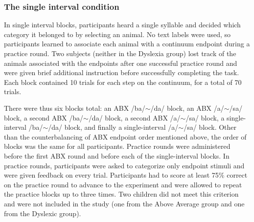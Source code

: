 \documentclass[../uwthesis.tex]{subfiles}
\begin{document}
\subsubsection{The single interval condition}
In single interval blocks, participants heard a single syllable and decided which category it belonged to by selecting an animal. No text labels were used, so participants learned to associate each animal with a continuum endpoint during a practice round. Two subjects (neither in the Dyslexia group) lost track of the animals associated with the endpoints after one successful practice round and were given brief additional instruction before successfully completing the task. Each block contained 10 trials for each step on the continuum, for a total of 70 trials. 

There were thus six blocks total: an ABX /ba/$\sim$/da/ block, an ABX /a/$\sim$/sa/ block, a second ABX /ba/$\sim$/da/ block, a second ABX /a/$\sim$/sa/ block, a single-interval /ba/$\sim$/da/ block, and finally a single-interval /a/$\sim$/sa/ block. Other than the counterbalancing of ABX endpoint order mentioned above, the order of blocks was the same for all participants. Practice rounds were administered before the first ABX round and before each of the single-interval blocks. In practice rounds, participants were asked to categorize only endpoint stimuli and were given feedback on every trial. Participants had to score at least 75\% correct on the practice round to advance to the experiment and were allowed to repeat the practice blocks up to three times. Two children did not meet this criterion and were not included in the study (one from the Above Average group and one from the Dyslexic group).
	
\end{document}
